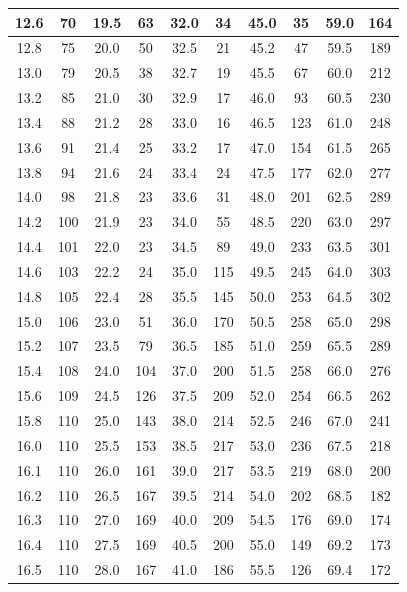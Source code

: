 \documentclass[UTF8,10pt,a4paper]{article}
\begin{document}
\begin{table}[h]
\begin{tabular}{|c|c|c|c|c|c|c|c|c|c|}
    12.6 & 70 & 19.5 & 63 & 32.0 & 34 & 45.0 & 35 & 59.0 & 164 \\ \hline
    12.8 & 75 & 20.0 & 50 & 32.5 & 21 & 45.2 & 47 & 59.5 & 189 \\ \hline
    13.0 & 79 & 20.5 & 38 & 32.7 & 19 & 45.5 & 67 & 60.0 & 212 \\ \hline
    13.2 & 85 & 21.0 & 30 & 32.9 & 17 & 46.0 & 93 & 60.5 & 230 \\ \hline
    13.4 & 88 & 21.2 & 28 & 33.0 & 16 & 46.5 & 123 & 61.0 & 248 \\ \hline
    13.6 & 91 & 21.4 & 25 & 33.2 & 17 & 47.0 & 154 & 61.5 & 265 \\ \hline
    13.8 & 94 & 21.6 & 24 & 33.4 & 24 & 47.5 & 177 & 62.0 & 277 \\ \hline
    14.0 & 98 & 21.8 & 23 & 33.6 & 31 & 48.0 & 201 & 62.5 & 289 \\ \hline
    14.2 & 100 & 21.9 & 23 & 34.0 & 55 & 48.5 & 220 & 63.0 & 297 \\ \hline
    14.4 & 101 & 22.0 & 23 & 34.5 & 89 & 49.0 & 233 & 63.5 & 301 \\ \hline
    14.6 & 103 & 22.2 & 24 & 35.0 & 115 & 49.5 & 245 & 64.0 & 303 \\ \hline
    14.8 & 105 & 22.4 & 28 & 35.5 & 145 & 50.0 & 253 & 64.5 & 302 \\ \hline
    15.0 & 106 & 23.0 & 51 & 36.0 & 170 & 50.5 & 258 & 65.0 & 298 \\ \hline
    15.2 & 107 & 23.5 & 79 & 36.5 & 185 & 51.0 & 259 & 65.5 & 289 \\ \hline
    15.4 & 108 & 24.0 & 104 & 37.0 & 200 & 51.5 & 258 & 66.0 & 276 \\ \hline
    15.6 & 109 & 24.5 & 126 & 37.5 & 209 & 52.0 & 254 & 66.5 & 262 \\ \hline
    15.8 & 110 & 25.0 & 143 & 38.0 & 214 & 52.5 & 246 & 67.0 & 241 \\ \hline
    16.0 & 110 & 25.5 & 153 & 38.5 & 217 & 53.0 & 236 & 67.5 & 218 \\ \hline
    16.1 & 110 & 26.0 & 161 & 39.0 & 217 & 53.5 & 219 & 68.0 & 200 \\ \hline
    16.2 & 110 & 26.5 & 167 & 39.5 & 214 & 54.0 & 202 & 68.5 & 182 \\ \hline
    16.3 & 110 & 27.0 & 169 & 40.0 & 209 & 54.5 & 176 & 69.0 & 174 \\ \hline
    16.4 & 110 & 27.5 & 169 & 40.5 & 200 & 55.0 & 149 & 69.2 & 173 \\ \hline
    16.5 & 110 & 28.0 & 167 & 41.0 & 186 & 55.5 & 126 & 69.4 & 172 \\ \hline

\end{tabular}
\end{table}
\end{document}
